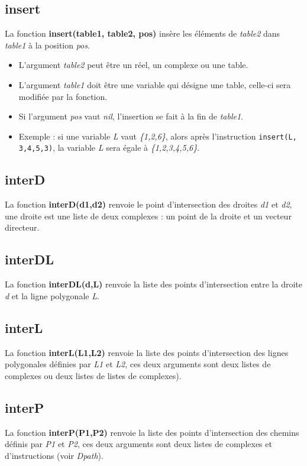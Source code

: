 \subsection{insert}
La fonction \textbf{insert(table1, table2, pos)} insère les éléments de \emph{table2} dans \emph{table1} à la position \emph{pos}.

\begin{itemize}
    \item L'argument \emph{table2} peut être un réel, un complexe ou une table.
    \item L'argument \emph{table1} doit être une variable qui désigne une table, celle-ci sera modifiée par la fonction.
    \item Si l'argument \emph{pos} vaut \emph{nil}, l'insertion se fait à la fin de \emph{table1}.
    \item Exemple : si une variable \emph{L} vaut \emph{\{1,2,6\}}, alors après l'instruction \texttt{insert(L, {3,4,5},3)}, la variable \emph{L} sera égale à \emph{\{1,2,3,4,5,6\}}.
\end{itemize}

\subsection{interD}
La fonction \textbf{interD(d1,d2)} renvoie le point d'intersection des droites \emph{d1} et \emph{d2}, une droite est une liste de deux complexes : un point de la droite et un vecteur directeur.

\subsection{interDL}
La fonction \textbf{interDL(d,L)} renvoie la liste des points d'intersection entre la droite \emph{d} et la ligne polygonale \emph{L}.

\subsection{interL}
La fonction \textbf{interL(L1,L2)} renvoie la liste des points d'intersection des lignes polygonales définies par \emph{L1} et \emph{L2}, ces deux arguments sont deux listes de complexes ou deux listes de listes de complexes).

\subsection{interP}
La fonction \textbf{interP(P1,P2)} renvoie la liste des points d'intersection des chemins définis par \emph{P1} et \emph{P2}, ces deux arguments sont deux listes de complexes et d'instructions (voir \emph{Dpath}).

